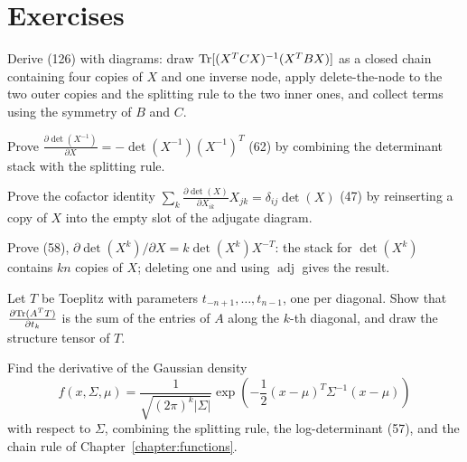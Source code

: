 \section{Exercises}

\begin{exercise}
Derive (126) with diagrams:
draw $\mathrm{Tr}[(X^T C X)^{-1} (X^T B X)]$ as a closed chain containing four copies of
$X$ and one inverse node, apply delete-the-node to the two outer copies and the
splitting rule to the two inner ones, and collect terms using the symmetry of
$B$ and $C$.
\end{exercise}

\begin{exercise}
Prove $\frac{\partial \det(X^{-1})}{\partial X} = -\det(X^{-1})(X^{-1})^T$ (62)
by combining the determinant stack with the splitting rule.
\end{exercise}

\begin{exercise}
Prove the cofactor identity
$\sum_k \frac{\partial \det(X)}{\partial X_{ik}} X_{jk} = \delta_{ij} \det(X)$ (47)
by reinserting a copy of $X$ into the empty slot of the adjugate diagram.
\end{exercise}

\begin{exercise}
Prove (58), $\partial \det(X^k)/\partial X = k \det(X^k) X^{-T}$:
the stack for $\det(X^k)$ contains $kn$ copies of $X$; deleting one and using
$\operatorname{adj}$ gives the result.
\end{exercise}

\begin{exercise}
Let $T$ be Toeplitz with parameters $t_{-n+1}, \dots, t_{n-1}$, one per diagonal.
Show that
$\frac{\partial \mathrm{Tr}(A^T T)}{\partial t_k}$ is the sum of the entries of $A$
along the $k$-th diagonal, and draw the structure tensor of $T$.
\end{exercise}

\begin{exercise}
Find the derivative of the Gaussian density
\[
   f(x,\Sigma,\mu) = \frac{1}{\sqrt{(2\pi)^k|\Sigma|}}
   \exp\left(-\frac12(x-\mu)^T \Sigma^{-1} (x-\mu)\right)
\]
with respect to $\Sigma$, combining the splitting rule, the log-determinant (57),
and the chain rule of Chapter~\ref{chapter:functions}.
\end{exercise}

